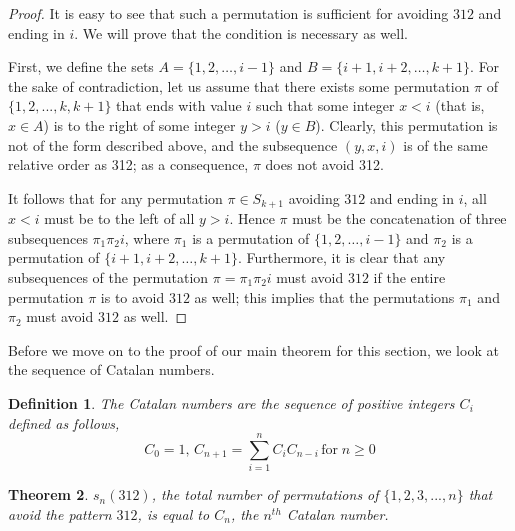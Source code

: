 \documentclass[11pt,letterpaper,twoside,english]{article}
\theoremstyle{theorem}
\newtheorem{theorem}{Theorem}
\newtheorem{definition}[theorem]{Definition}
\theoremstyle{remark}
\begin{document}
\begin{proof}

It is easy to see that such a permutation is sufficient for avoiding $312$ and ending in $i$. We will prove that the condition is necessary as well.

First, we define the sets $A=\{1,2,\ldots,i-1\}$ and $B=\{i+1,i+2,\ldots,k+1\}$. For the sake of contradiction, let us assume that there exists some permutation $\pi$ of $\{1,2,...,k,k+1\}$ that ends with value $i$ such that some integer $x < i$ (that is, $x \in A$) is to the right of some integer $y > i$ ($y \in B$). Clearly, this permutation is not of the form described above, and the subsequence $(y, x, i)$ is of the same relative order as 312; as a consequence, $\pi$ does not avoid 312.

It follows that for any permutation $\pi\in S_{k+1}$ avoiding $312$ and ending in $i$, all $x < i$ must be to the left of all $y > i$. Hence $\pi$ must be the concatenation of three subsequences $\pi_1 \pi_2 i$, where $\pi_1$ is a permutation of $\{1, 2, \ldots, i-1\}$ and $\pi_2$ is a permutation of $\{i+1, i+2, \ldots, k+1\}$. Furthermore, it is clear that any subsequences of the permutation $\pi = \pi_1 \pi_2 i$ must avoid $312$ if the entire permutation $\pi$ is to avoid $312$ as well; this implies that the permutations $\pi_1$ and $\pi_2$ must avoid $312$ as well.
\end{proof}

Before we move on to the proof of our main theorem for this section, we look at the sequence of Catalan numbers.

\begin{definition}
The Catalan numbers are the sequence of positive integers $C_i$ defined as follows,
$$C_0=1, \, C_{n+1}=\sum_{i=1}^n C_iC_{n-i} \, \text{for} \; n \geq 0$$
\end{definition}

\begin{theorem}
$s_n(312)$, the total number of permutations of $\{1,2,3,...,n\}$ that avoid the pattern $312$, is equal to $C_n$, the $n^{th}$ Catalan number.
\end{theorem}
\end{document}
